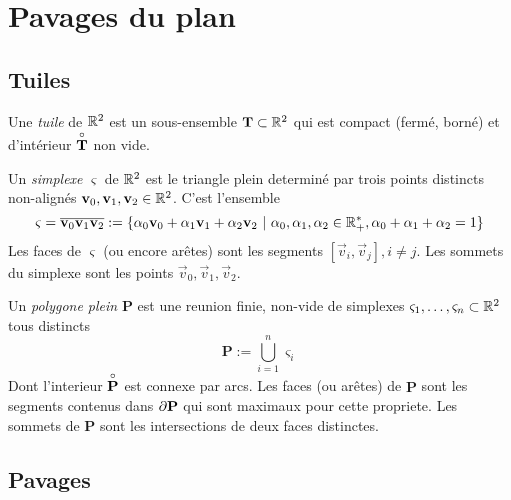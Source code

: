 \section{Pavages du plan}
\subsection{Tuiles}

\begin{definition}
	Une \emph{tuile} de $\mathbb{R}^2$ est un sous-ensemble $\mathbf{T} \subset \mathbb{R}^2$ qui est
compact (fermé, borné) et d'intérieur $\overset{\circ}{\mathbf{T}}$ non vide.
\end{definition}

\begin{definition}
	Un \emph{simplexe} $\varsigma$ de $\mathbb{R}^2$ est le triangle plein
	determiné par trois points
	distincts non-alignés $\mathbf{v}_0, \mathbf{v}_1, \mathbf{v}_2 \in \mathbb{R}^2$. C'est l'ensemble
	\begin{equation*}
		\varsigma = \overline{\mathbf{v}_0\mathbf{v}_1\mathbf{v}_2} := \{\alpha_0\mathbf{v}_0
			+ \alpha_1\mathbf{v}_1 + \alpha_2\mathbf{v}_2\  |\  \alpha_0, \alpha_1,
			\alpha_2 \in \mathbb{R}^*_+, \alpha_0 + \alpha_1 + \alpha_2 = 1\}
	\end{equation*}
	Les faces de $\varsigma$ (ou encore arêtes) sont les segments $[\vec{v}_i,
	\vec{v}_j], i \neq j$. Les sommets du simplexe sont les points $\vec{v}_0,
	\vec{v}_1, \vec{v}_2$.
\end{definition}

\begin{definition}
	Un \emph{polygone plein} $\mathbf{P}$ est une reunion finie, non-vide de simplexes
	$\varsigma_1,
	\dots, \varsigma_n \subset \mathbb{R}^2$ tous distincts
	\begin{equation*}
		\mathbf{P} := \bigcup_{i=1}^n\varsigma_i
	\end{equation*}
	Dont l'interieur $\overset{\circ}{\mathbf{P}}$ est connexe par arcs. Les faces (ou arêtes)
	de $\mathbf{P}$ sont les segments contenus dans $\partial \mathbf{P}$ qui sont
	maximaux pour cette propriete. Les sommets de $\mathbf{P}$ sont les
	intersections de deux faces distinctes.
\end{definition}

\subsection{Pavages}

